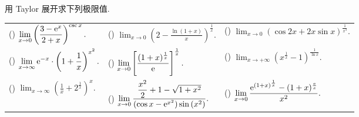 \begin{example}
    用 Taylor 展开求下列极限值.
    \setcounter{magicrownumbers}{0}
    \begin{table}[H]
        \centering
        \begin{tabular}{l | l | l}
            (\rownumber{}) $\displaystyle\lim_{x\to 0}\left(\frac{3-\mathrm{e} ^x}{2+x}\right)^{\csc x}.$          & (\rownumber{}) $\displaystyle\lim_{x\to 0}\left(2-\frac{\ln(1+x)}{x}\right)^{\frac{1}{x}}.$                                         & (\rownumber{}) $\displaystyle\lim_{x\to 0}(\cos 2x+2x\sin x)^{\frac{1}{x^4}}.$                        \\
            (\rownumber{}) $\displaystyle\lim_{x\to \infty}\mathrm{e} ^{-x}\cdot\left(1+\frac{1}{x}\right)^{x^2}.$ & (\rownumber{}) $\displaystyle\lim_{x\to 0}\left[\frac{(1+x)^{\frac{1}{x}}}{\mathrm{e} }\right]^{\frac{1}{x}}.$                              & (\rownumber{}) $\displaystyle\lim_{x\to +\infty}\left(x^{\frac{1}{x}}-1\right)^{\frac{1}{\ln x}}.$    \\
            (\rownumber{}) $\displaystyle\lim_{x\to \infty}\left(\frac{1}{x}+2^{\frac{1}{x}}\right)^x.$    & (\rownumber{}) $\displaystyle\lim_{x\to0}\frac{\dfrac{x^2}{2}+1-\sqrt{1+x^2}}{\left(\cos x-\mathrm{e} ^{x^2}\right)\sin \left(x^2\right)}.$ & (\rownumber{}) $\displaystyle\lim_{x\to0}\dfrac{\mathrm{e}^{(1+x)^{\frac{1}{x}}}-(1+x)^{\frac{\mathrm{e}}{x}}}{x^2}.$ \\
        \end{tabular}
    \end{table}
\end{example}
